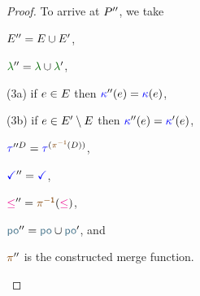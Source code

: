 \begin{lemma}
\begin{proof}
    To arrive at $P''$, we take
    \begin{enumerate*}
    \item
      $E''=E\cup E'$,
    \item
      $\labeling''=\labeling\cup\labeling'$,
    \item[(3a)]
      if $e\in E$ then ${\color{blue}\kappa}''(e)={\color{blue}\kappa}(e)$,
    \item[(3b)]
      if $e\in E'\setminus E$ then ${\color{blue}\kappa}''(e)={\color{blue}\kappa}'(e)$,
    \item
      $\aTr{\prime\prime\bEvs}{}=\aTr{(\fmrginv{\bEvs})}{}$,
    \item
      $\aTerm''=\aTerm$,
    \item \label{le-item}
      ${\le''}=\fmrginv{\le}$,
    \item \label{pox-item}
      ${\rpox''}={\rpox}\cup{\rpox'}$, and
    \item 
      $\fmrg{}''$ is the constructed merge function. %
    \end{enumerate*}
  \end{proof}
\end{lemma}
